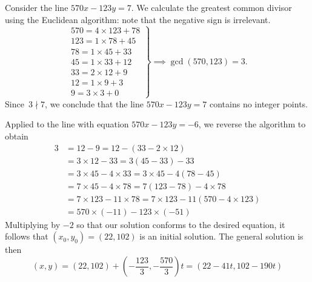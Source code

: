 \begin{examples}
  \item Consider the line $570x-123y=7$. We calculate the greatest common divisor using the Euclidean algorithm: note that the negative sign is irrelevant.
  \[\renewcommand{\arraystretch}{1.1}\left.\begin{array}{l}
	570=4\times 123+78\\
	123=1\times 78+45\\
	78=1\times 45+33\\
	45=1\times 33+12\\
	33=2\times 12+9\\
	12=1\times 9+3\\
	9=3\times 3+0
  \end{array}\right\}\implies\gcd(570,123)=3.\]
  Since $\,3\nmid 7$, we conclude that the line $570 x-123 y=7$ contains no integer points.
  \item Applied to the line with equation $570x-123y=-6$, we reverse the algorithm to obtain
  \begin{align*}
  3&=12-9=12-(33-2\times 12)\\
  &=3\times 12-33=3(45-33)-33\\
  &=3\times 45-4\times 33=3\times 45-4(78-45)\\
  &=7\times 45-4\times 78=7(123-78)-4\times 78\\
  &=7\times 123-11\times 78=7\times 123-11(570-4\times 123)\\
  &=570\times (-11)-123\times (-51)
  \end{align*}
  Multiplying by $-2$ so that our solution conforms to the desired equation, it follows that $(x_0,y_0)=(22,102)$ is an initial solution. The general solution is then
  \[(x,y)=(22,102)+\left(-\frac{123}3,-\frac{570}3\right)t=(22-41t,102-190t)\]
\end{examples}



